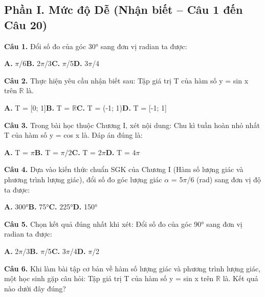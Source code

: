 \documentclass[11pt,a4paper]{article}
\begin{document}
\subsection*{\color{accent} Phần I. Mức độ Dễ (Nhận biết -- Câu 1 đến Câu 20)}
\textbf{\color{primary} Câu 1.} Đổi số đo của góc 30° sang đơn vị radian ta được:\par
\hspace*{1.5em}\textbf{A.} $\pi$/6\quad\quad \textbf{B.} 2$\pi$/3\quad\quad \textbf{C.} $\pi$/5\quad\quad \textbf{D.} 3$\pi$/4\par\vspace{2pt}
\textbf{\color{primary} Câu 2.} Thực hiện yêu cầu nhận biết sau: Tập giá trị T của hàm số y = sin x trên $\mathbb{R}$ là.\par
\hspace*{1.5em}\textbf{A.} T = [0; 1]\quad\quad \textbf{B.} T = $\mathbb{R}$\quad\quad \textbf{C.} T = (-1; 1)\quad\quad \textbf{D.} T = [-1; 1]\par\vspace{2pt}
\textbf{\color{primary} Câu 3.} Trong bài học thuộc Chương I, xét nội dung: Chu kì tuần hoàn nhỏ nhất T của hàm số y = cos x là. Đáp án đúng là:\par
\hspace*{1.5em}\textbf{A.} T = $\pi$\quad\quad \textbf{B.} T = $\pi$/2\quad\quad \textbf{C.} T = 2$\pi$\quad\quad \textbf{D.} T = 4$\pi$\par\vspace{2pt}
\textbf{\color{primary} Câu 4.} Dựa vào kiến thức chuẩn SGK của Chương I (Hàm số lượng giác và phương trình lượng giác), đổi số đo góc lượng giác $\alpha$ = 5$\pi$/6 (rad) sang đơn vị độ ta được:\par
\hspace*{1.5em}\textbf{A.} 300°\quad\quad \textbf{B.} 75°\quad\quad \textbf{C.} 225°\quad\quad \textbf{D.} 150°\par\vspace{2pt}
\textbf{\color{primary} Câu 5.} Chọn kết quả đúng nhất khi xét: Đổi số đo của góc 90° sang đơn vị radian ta được:\par
\hspace*{1.5em}\textbf{A.} 2$\pi$/3\quad\quad \textbf{B.} $\pi$/5\quad\quad \textbf{C.} 3$\pi$/4\quad\quad \textbf{D.} $\pi$/2\par\vspace{2pt}
\textbf{\color{primary} Câu 6.} Khi làm bài tập cơ bản về hàm số lượng giác và phương trình lượng giác, một học sinh gặp câu hỏi: Tập giá trị T của hàm số y = sin x trên $\mathbb{R}$ là. Kết quả nào dưới đây đúng?\par
\end{document}
